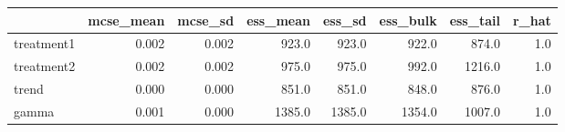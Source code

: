 \begin{tabular}{lrrrrrrr}
\toprule
{} &  mcse\_mean &  mcse\_sd &  ess\_mean &  ess\_sd &  ess\_bulk &  ess\_tail &  r\_hat \\
\midrule
treatment1 &      0.002 &    0.002 &     923.0 &   923.0 &     922.0 &     874.0 &    1.0 \\
treatment2 &      0.002 &    0.002 &     975.0 &   975.0 &     992.0 &    1216.0 &    1.0 \\
trend      &      0.000 &    0.000 &     851.0 &   851.0 &     848.0 &     876.0 &    1.0 \\
gamma      &      0.001 &    0.000 &    1385.0 &  1385.0 &    1354.0 &    1007.0 &    1.0 \\
\bottomrule
\end{tabular}
